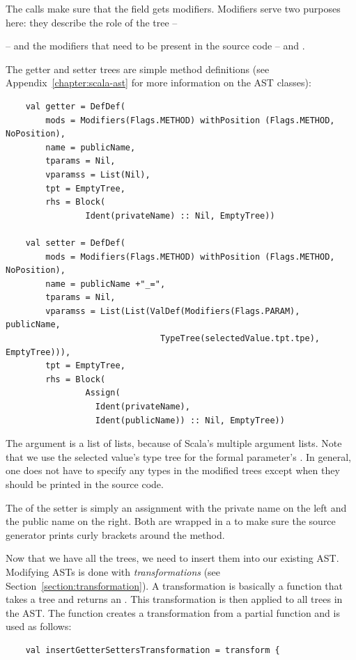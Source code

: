 \documentclass[10pt,a4paper,oneside]{scrreprt}
\begin{document}
The  calls make sure that the field gets  modifiers. Modifiers serve two purposes here: they describe the role of the tree -- { -- and the modifiers that need to be present in the source code --  and .

The getter and setter trees are simple method definitions (see Appendix~\vref{chapter:scala-ast} for more information on the AST classes):

\begin{lstlisting}
    val getter = DefDef(
        mods = Modifiers(Flags.METHOD) withPosition (Flags.METHOD, NoPosition), 
        name = publicName, 
        tparams = Nil, 
        vparamss = List(Nil), 
        tpt = EmptyTree, 
        rhs = Block(
                Ident(privateName) :: Nil, EmptyTree))
    
    val setter = DefDef(
        mods = Modifiers(Flags.METHOD) withPosition (Flags.METHOD, NoPosition), 
        name = publicName +"_=",
        tparams = Nil,
        vparamss = List(List(ValDef(Modifiers(Flags.PARAM), publicName, 
                               TypeTree(selectedValue.tpt.tpe), EmptyTree))), 
        tpt = EmptyTree,
        rhs = Block(
                Assign(
                  Ident(privateName),
                  Ident(publicName)) :: Nil, EmptyTree))
\end{lstlisting}

The  argument is a list of lists, because of Scala's multiple argument lists. Note that we use the selected value's type tree for the formal parameter's . In general, one does not have to specify any types in the modified trees except when they should be printed in the source code.

The  of the setter is simply an assignment with the private name on the left and the public name on the right. Both  are wrapped in a  to make sure the source generator prints curly brackets around the method.

Now that we have all the trees, we need to insert them into our existing AST. Modifying ASTs is done with \textit{transformations} (see Section~\vref{section:transformation}). A transformation is basically a function that takes a tree and returns an . This transformation is then applied to all trees in the AST. 
\newpage
The  function creates a transformation from a partial function and is used as follows:

\begin{lstlisting}
    val insertGetterSettersTransformation = transform {
        

\end{lstlisting}}
\end{document}
